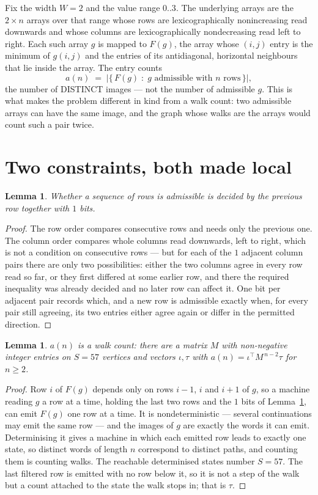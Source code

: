 \documentclass[11pt,a4paper]{article}
\theoremstyle{plain}
\newtheorem{lemma}[theorem]{Lemma}
\theoremstyle{definition}
\begin{document}
Fix the width $W=2$ and the value range $0..3$. The underlying arrays are the
$2\times n$ arrays over that range whose rows are lexicographically nonincreasing read downwards
and whose columns are lexicographically nondecreasing read left to right. Each such array $g$
is mapped to $F(g)$, the array whose $(i,j)$ entry is the minimum of $g(i,j)$ and the entries
of its antidiagonal, horizontal neighbours that lie inside the array. The entry counts
\[
a(n)\;=\;\bigl|\{\,F(g)\;:\;g\text{ admissible with }n\text{ rows}\,\}\bigr|,
\]
the number of DISTINCT images --- not the number of admissible $g$. This is what makes the
problem different in kind from a walk count: two admissible arrays can have the same image, and
the graph whose walks are the arrays would count such a pair twice.

\section{Two constraints, both made local}

\begin{lemma}\label{lem:local}
Whether a sequence of rows is admissible is decided by the previous row together with
$1$ bits.
\end{lemma}

\begin{proof}
The row order compares consecutive rows and needs only the previous one. The column order
compares whole columns read downwards, left to right, which is not a condition on consecutive
rows --- but for each of the $1$ adjacent column pairs there are only two possibilities:
either the two columns agree in every row read so far, or they first differed at some earlier
row, and there the required inequality was already decided and no later row can affect it. One
bit per adjacent pair records which, and a new row is admissible exactly when, for every pair
still agreeing, its two entries either agree again or differ in the permitted direction.
\end{proof}

\begin{lemma}\label{lem:det}
$a(n)$ is a walk count: there are a matrix $M$ with non-negative integer entries on $S=57$
vertices and vectors $\iota,\tau$ with $a(n)=\iota^{\!\top}M^{\,n-2}\tau$ for $n\ge2$.
\end{lemma}

\begin{proof}
Row $i$ of $F(g)$ depends only on rows $i-1$, $i$ and $i+1$ of $g$, so a machine reading $g$ a
row at a time, holding the last two rows and the $1$ bits of Lemma~\ref{lem:local}, can
emit $F(g)$ one row at a time. It is nondeterministic --- several continuations may emit the
same row --- and the images of $g$ are exactly the words it can emit. Determinising it gives a
machine in which each emitted row leads to exactly one state, so distinct words of length $n$
correspond to distinct paths, and counting them is counting walks. The reachable determinised
states number $S=57$. The last filtered row is emitted with no row below it, so it is not a
step of the walk but a count attached to the state the walk stops in; that is $\tau$.
\end{proof}
\end{document}
